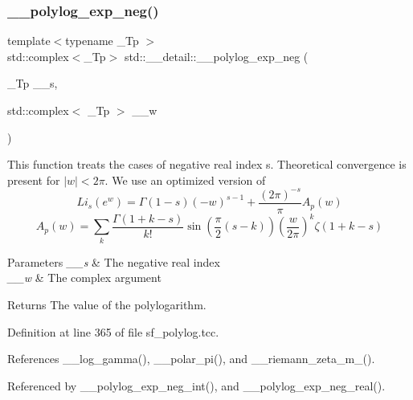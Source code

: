 \mbox{\label{namespacestd_1_1____detail_a07b26b8c7ff467310e4e1df6e3efd893}} 
\subsubsection{\texorpdfstring{\+\_\+\+\_\+polylog\+\_\+exp\+\_\+neg()}{\_\_polylog\_exp\_neg()}\hspace{0.1cm}{\footnotesize\ttfamily [1/2]}}
{\footnotesize\ttfamily template$<$typename \+\_\+\+Tp $>$ \\
std\+::complex$<$\+\_\+\+Tp$>$ std\+::\+\_\+\+\_\+detail\+::\+\_\+\+\_\+polylog\+\_\+exp\+\_\+neg (\begin{DoxyParamCaption}\item[{\+\_\+\+Tp}]{\+\_\+\+\_\+s,  }\item[{std\+::complex$<$ \+\_\+\+Tp $>$}]{\+\_\+\+\_\+w }\end{DoxyParamCaption})}

This function treats the cases of negative real index s. Theoretical convergence is present for $ |w| < 2\pi $. We use an optimized version of \[ Li_s(e^w) = \Gamma(1-s)(-w)^{s-1} + \frac{(2\pi)^{-s}}{\pi} A_p(w) \] \[ A_p(w) = \sum_k \frac{\Gamma(1+k-s)}{k!} \sin\left(\frac{\pi}{2} (s-k)\right) \left(\frac{w}{2\pi}\right)^k \zeta(1+k-s) \] 
\begin{DoxyParams}{Parameters}
{\em \+\_\+\+\_\+s} & The negative real index \\
\hline
{\em \+\_\+\+\_\+w} & The complex argument \\
\hline
\end{DoxyParams}
\begin{DoxyReturn}{Returns}
The value of the polylogarithm. 
\end{DoxyReturn}


Definition at line 365 of file sf\+\_\+polylog.\+tcc.



References \+\_\+\+\_\+log\+\_\+gamma(), \+\_\+\+\_\+polar\+\_\+pi(), and \+\_\+\+\_\+riemann\+\_\+zeta\+\_\+m\+\_().



Referenced by \+\_\+\+\_\+polylog\+\_\+exp\+\_\+neg\+\_\+int(), and \+\_\+\+\_\+polylog\+\_\+exp\+\_\+neg\+\_\+real().

